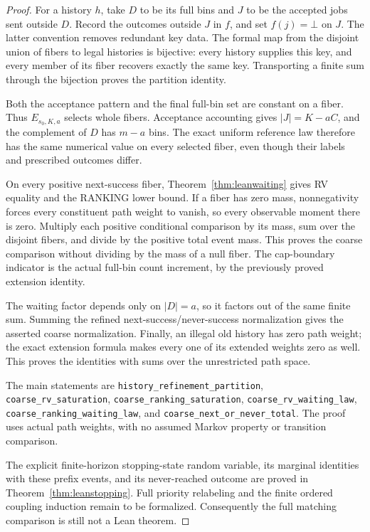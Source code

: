 \documentclass[11pt]{article}
\begin{document}
\begin{proof}
For a history $h$, take $D$ to be its full bins and $J$ to be the
accepted jobs sent outside $D$. Record the outcomes outside $J$ in $f$,
and set $f(j)=\bot$ on $J$. The latter convention removes redundant
key data. The formal map from the disjoint union of fibers to legal
histories is bijective: every history supplies this key, and every
member of its fiber recovers exactly the same key. Transporting a
finite sum through the bijection proves the partition identity.

Both the acceptance pattern and the final full-bin set are constant
on a fiber. Thus $E_{s_0,K,a}$ selects whole fibers. Acceptance accounting
gives $|J|=K-aC$, and the complement of $D$ has $m-a$ bins. The exact
uniform reference law therefore has the same numerical value on every
selected fiber, even though their labels and prescribed outcomes differ.

On every positive next-success fiber, Theorem~\ref{thm:leanwaiting}
gives RV equality and the RANKING lower bound. If a fiber has zero mass,
nonnegativity forces every constituent path weight to vanish, so every
observable moment there is zero. Multiply each positive conditional
comparison by its mass, sum over the disjoint fibers, and divide by
the positive total event mass. This proves the coarse comparison
without dividing by the mass of a null fiber. The cap-boundary indicator
is the actual full-bin count increment, by the previously proved
extension identity.

The waiting factor depends only on $|D|=a$, so it factors out of the
same finite sum. Summing the refined next-success/never-success
normalization gives the asserted coarse normalization. Finally, an
illegal old history has zero path weight; the exact extension formula
makes every one of its extended weights zero as well. This proves the
identities with sums over the unrestricted path space.

The main statements are \texttt{history\_refinement\_partition},
\texttt{coarse\_rv\_saturation}, \texttt{coarse\_ranking\_saturation},
\texttt{coarse\_rv\_waiting\_law},
\texttt{coarse\_ranking\_waiting\_law}, and
\texttt{coarse\_next\_or\_never\_total}. The proof uses actual path
weights, with no assumed Markov property or transition comparison.

The explicit finite-horizon stopping-state random variable, its marginal
identities with these prefix events, and its never-reached outcome are
proved in Theorem~\ref{thm:leanstopping}. Full priority relabeling and
the finite ordered coupling induction remain to be formalized. Consequently the full
matching comparison is still not a Lean theorem.
\end{proof}
\end{document}
